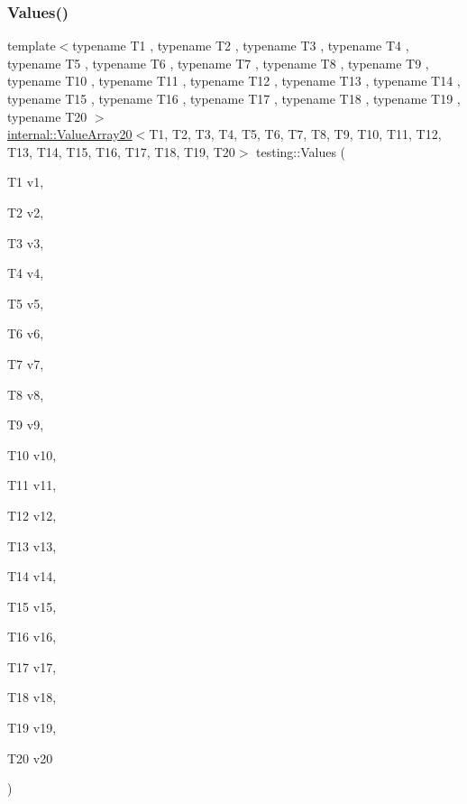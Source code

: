 \subsubsection{\texorpdfstring{Values()}{Values()}\hspace{0.1cm}{\footnotesize\ttfamily [20/50]}}
{\footnotesize\ttfamily template$<$typename T1 , typename T2 , typename T3 , typename T4 , typename T5 , typename T6 , typename T7 , typename T8 , typename T9 , typename T10 , typename T11 , typename T12 , typename T13 , typename T14 , typename T15 , typename T16 , typename T17 , typename T18 , typename T19 , typename T20 $>$ \\
\mbox{\hyperlink{classtesting_1_1internal_1_1ValueArray20}{internal\+::\+Value\+Array20}}$<$T1, T2, T3, T4, T5, T6, T7, T8, T9, T10, T11, T12, T13, T14, T15, T16, T17, T18, T19, T20$>$ testing\+::\+Values (\begin{DoxyParamCaption}\item[{T1}]{v1,  }\item[{T2}]{v2,  }\item[{T3}]{v3,  }\item[{T4}]{v4,  }\item[{T5}]{v5,  }\item[{T6}]{v6,  }\item[{T7}]{v7,  }\item[{T8}]{v8,  }\item[{T9}]{v9,  }\item[{T10}]{v10,  }\item[{T11}]{v11,  }\item[{T12}]{v12,  }\item[{T13}]{v13,  }\item[{T14}]{v14,  }\item[{T15}]{v15,  }\item[{T16}]{v16,  }\item[{T17}]{v17,  }\item[{T18}]{v18,  }\item[{T19}]{v19,  }\item[{T20}]{v20 }\end{DoxyParamCaption})}

\mbox{\label{namespacetesting_a6f3b9661b48f2c663dbe5fcfb0720f5f}} 
